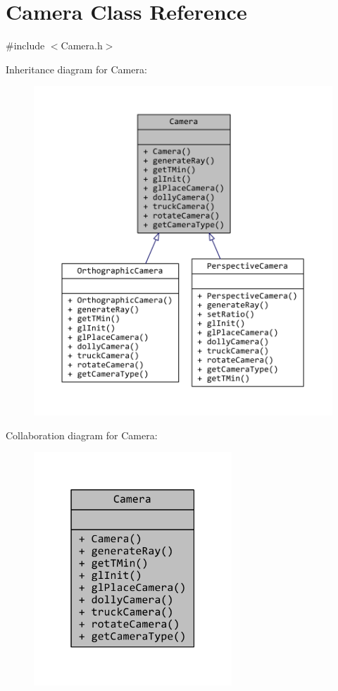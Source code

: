 \hypertarget{classCamera}{\section{Camera Class Reference}
\label{classCamera}
}


{\ttfamily \#include $<$Camera.\+h$>$}



Inheritance diagram for Camera\+:
\nopagebreak
\begin{figure}[H]
\begin{center}
\leavevmode
\includegraphics[width=350pt]{classCamera__inherit__graph}
\end{center}
\end{figure}


Collaboration diagram for Camera\+:
\nopagebreak
\begin{figure}[H]
\begin{center}
\leavevmode
\includegraphics[width=211pt]{classCamera__coll__graph}
\end{center}
\end{figure}
